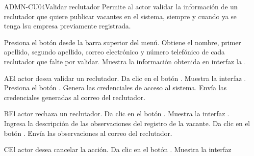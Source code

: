 \begin{UseCase}{ADMN-CU04}{Validar reclutador}{
	Permite al actor validar la información de un reclutador que quiere publicar vacantes en el sistema, siempre y cuando ya se tenga lsu empresa previamente registrada.
}
	  

\end{UseCase}

\begin{UCtrayectoria}
	\UCpaso [\UCactor] Presiona el botón  desde la barra superior del menú.
	\UCpaso [\UCsist] Obtiene el nombre, primer apellido, segundo apellido, correo electrónico y número telefónico de cada reclutador que falte por validar. 
    \UCpaso [\UCsist] Muestra la información obtenida en interfaz la .
\end{UCtrayectoria}

\begin{UCtrayectoriaA}{A}{El actor desea validar un reclutador.}
	\UCpaso [\UCactor] Da clic en el botón .
	\UCpaso [\UCsist] Muestra la interfaz .
	\UCpaso [\UCsist] Presiona el botón .
	\UCpaso [\UCsist] Genera las credenciales de acceso al sistema.
	\UCpaso [\UCsist] Envía las credenciales generadas al correo del reclutador.
\end{UCtrayectoriaA} 

\begin{UCtrayectoriaA}{B}{El actor rechaza un reclutador.}
	\UCpaso [\UCactor] Da clic en el botón .
	\UCpaso [\UCsist] Muestra la interfaz .
	\UCpaso [\UCactor] Ingresa la descripción de las observaciones del registro de la vacante.
	\UCpaso [\UCactor] Da clic en el botón .
	\UCpaso [\UCsist] Envía las observaciones al correo del reclutador.
\end{UCtrayectoriaA} 

\begin{UCtrayectoriaA}{C}{El actor desea cancelar la acción.}
	\UCpaso [\UCactor] Da clic en el botón .
	\UCpaso [\UCsist] Muestra la interfaz 
\end{UCtrayectoriaA} 


